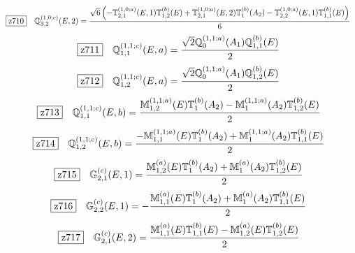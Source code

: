 \documentclass[fleqn,10pt,landscape]{jsarticle}
\begin{document}
\begin{dmath*}
\hspace*{3mm}\fbox{z710}\quad \mathbb{Q}_{3,2}^{(1,0;c)}(E,2)=\frac{\sqrt{6} \left(- \mathbb{T}_{2,1}^{(1,0;a)}(E,1) \mathbb{T}_{1,2}^{(b)}(E) + \mathbb{T}_{2,1}^{(1,0;a)}(E,2) \mathbb{T}_{1}^{(b)}(A_{2}) - \mathbb{T}_{2,2}^{(1,0;a)}(E,1) \mathbb{T}_{1,1}^{(b)}(E)\right)}{6}
\end{dmath*}
\begin{dmath*}
\hspace*{3mm}\fbox{z711}\quad \mathbb{Q}_{1,1}^{(1,1;c)}(E,a)=\frac{\sqrt{2} \mathbb{Q}_{0}^{(1,1;a)}(A_{1}) \mathbb{Q}_{1,1}^{(b)}(E)}{2}
\end{dmath*}
\begin{dmath*}
\hspace*{3mm}\fbox{z712}\quad \mathbb{Q}_{1,2}^{(1,1;c)}(E,a)=\frac{\sqrt{2} \mathbb{Q}_{0}^{(1,1;a)}(A_{1}) \mathbb{Q}_{1,2}^{(b)}(E)}{2}
\end{dmath*}
\begin{dmath*}
\hspace*{3mm}\fbox{z713}\quad \mathbb{Q}_{1,1}^{(1,1;c)}(E,b)=\frac{\mathbb{M}_{1,2}^{(1,1;a)}(E) \mathbb{T}_{1}^{(b)}(A_{2}) - \mathbb{M}_{1}^{(1,1;a)}(A_{2}) \mathbb{T}_{1,2}^{(b)}(E)}{2}
\end{dmath*}
\begin{dmath*}
\hspace*{3mm}\fbox{z714}\quad \mathbb{Q}_{1,2}^{(1,1;c)}(E,b)=\frac{- \mathbb{M}_{1,1}^{(1,1;a)}(E) \mathbb{T}_{1}^{(b)}(A_{2}) + \mathbb{M}_{1}^{(1,1;a)}(A_{2}) \mathbb{T}_{1,1}^{(b)}(E)}{2}
\end{dmath*}
\begin{dmath*}
\hspace*{3mm}\fbox{z715}\quad \mathbb{G}_{2,1}^{(c)}(E,1)=\frac{\mathbb{M}_{1,2}^{(a)}(E) \mathbb{T}_{1}^{(b)}(A_{2}) + \mathbb{M}_{1}^{(a)}(A_{2}) \mathbb{T}_{1,2}^{(b)}(E)}{2}
\end{dmath*}
\begin{dmath*}
\hspace*{3mm}\fbox{z716}\quad \mathbb{G}_{2,2}^{(c)}(E,1)=- \frac{\mathbb{M}_{1,1}^{(a)}(E) \mathbb{T}_{1}^{(b)}(A_{2}) + \mathbb{M}_{1}^{(a)}(A_{2}) \mathbb{T}_{1,1}^{(b)}(E)}{2}
\end{dmath*}
\begin{dmath*}
\hspace*{3mm}\fbox{z717}\quad \mathbb{G}_{2,1}^{(c)}(E,2)=\frac{\mathbb{M}_{1,1}^{(a)}(E) \mathbb{T}_{1,1}^{(b)}(E) - \mathbb{M}_{1,2}^{(a)}(E) \mathbb{T}_{1,2}^{(b)}(E)}{2}
\end{dmath*}
\end{document}
